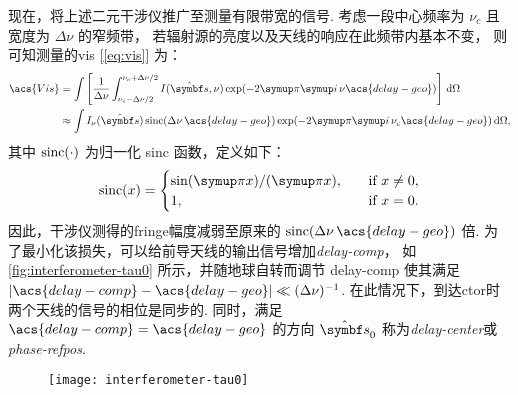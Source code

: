 现在，将上述二元干涉仪推广至测量有限带宽的信号.
考虑一段中心频率为 $\nu_c$ 且宽度为 $\Delta\nu$ 的窄频带，
若辐射源的亮度以及天线的响应在此频带内基本不变，
则可知测量的\ac{vis} [\autoref{eq:vis}] 为：
\begin{align}
  \acs{Vis} &= \int \left[ \frac{1}{\Delta\nu}
        \int_{\nu_c-\Delta\nu/2}^{\nu_c+\Delta\nu/2}
        I(\hat{\B{s}}, \nu) \exp (-2\Cpi\Ci\, \nu\acs{delay-geo})
      \right] \,\D{\Omega} \\
    &\approx \int I_{\nu}(\hat{\B{s}}) \sinc (\Delta\nu\,\acs{delay-geo})
      \exp (-2\Cpi\Ci\, \nu_c\acs{delay-geo}) \,\D{\Omega},
  \label{eq:vis-bw}
\end{align}
其中 $\operatorname{sinc}(\cdot)$ 为归一化 sinc 函数，定义如下：
\begin{equation}
  \label{eq:sinc}
  \sinc(x) =
    \begin{cases}
      \sin(\Cpi x) / (\Cpi x), & \quad \text{if } x \neq 0, \\
      1, & \quad \text{if } x = 0.
    \end{cases}
\end{equation}
因此，干涉仪测得的\ac{fringe}幅度减弱至原来的
$\sinc(\Delta\nu\,\acs{delay-geo})$ 倍.
为了最小化该损失，可以给前导天线的输出信号增加\emph{\acf{delay-comp}}，
如\autoref{fig:interferometer-tau0} 所示，并随地球自转而调节 \acs{delay-comp}
使其满足 $|\acs{delay-comp} - \acs{delay-geo}| \ll (\Delta\nu)^{-1}$.
在此情况下，到达\ac{ctor}时两个天线的信号的相位是同步的.
同时，满足 $\acs{delay-comp} = \acs{delay-geo}$ 的方向 $\hat{\B{s}}_0$
称为\emph{\acf{delay-center}}或\emph{\acf{phase-refpos}}.

\begin{figure}[htp]
  \centering
  \texttt{[image: interferometer-tau0]}
  \label{fig:interferometer-tau0}
\end{figure}

